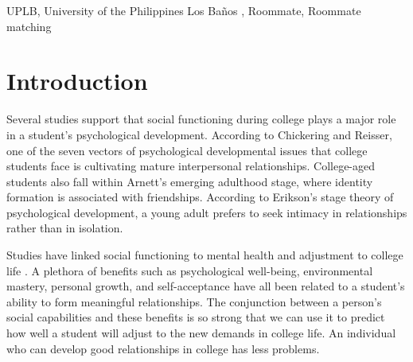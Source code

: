 \documentclass[journal]{./IEEE/IEEEtran}
\title{\SPTITLE}
\author{\ADVISEE~and~\ADVISER%
\REMARK
}
\newcommand{\UPLB}{University of the Philippines Los Ba\~{n}os }
\begin{document}
\maketitle

\begin{abstract}
This article explores the role and significance of roommates in a college student's development - from the initial adaptation with the roommate setting, to his/her academic performance and life after college. We highlight the importance of finding the proper roommates so that a student can maximize his/her psychological development, get higher grades, and develop open-mindedness. We also propose a solution in the form of a web application that can help \UPLB students find mutually beneficial roommates for their college life. This solution also extends itself to solve the dorm-finding problem students experience at the start of every semester.
\end{abstract}

\begin{keywords}
UPLB, \UPLB, Roommate, Roommate matching
\end{keywords}

\section{Introduction}

Several studies support that social functioning during college plays a major role in a student's psychological development. According to Chickering and Reisser, one of the seven vectors of psychological developmental issues that college students face is cultivating mature interpersonal relationships\cite{chickering}. College-aged students also fall within Arnett's emerging adulthood stage, where identity formation is associated with friendships\cite{erb}. According to Erikson's stage theory of psychological development, a young adult prefers to seek intimacy in relationships rather than in isolation\cite{erikson}.

Studies have linked social functioning to mental health and adjustment to college life \cite{erb}. A plethora of benefits such as psychological well-being, environmental mastery, personal growth, and self-acceptance have all been related to a student's ability to form meaningful relationships\cite{erb}. The conjunction between a person’s social capabilities and these benefits is so strong that we can use it to predict how well a student  will adjust to the new demands in college life. An individual who can develop good relationships in college has less problems.
\end{document}
